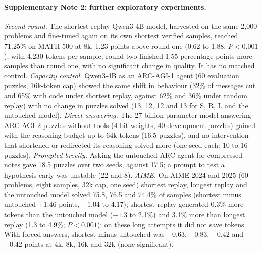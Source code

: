 \documentclass[10pt]{article}
\begin{document}
\paragraph{Supplementary Note 2: further exploratory experiments.} \emph{Second round.} The shortest-replay Qwen3-4B model, harvested on the same 2{,}000 problems and fine-tuned again on its own shortest verified samples, reached 71.25\% on MATH-500 at 8k, 1.23 points above round one (0.62 to 1.88; $P<0.001$), with 4{,}230 tokens per sample; round two finished 1.55 percentage points more samples than round one, with no significant change in quality. It has no matched control. \emph{Capacity control.} Qwen3-4B as an ARC-AGI-1 agent (60 evaluation puzzles, 16k-token cap) showed the same shift in behaviour (32\% of messages cut and 65\% with code under shortest replay, against 62\% and 36\% under random replay) with no change in puzzles solved (13, 12, 12 and 13 for S, R, L and the untouched model). \emph{Direct answering.} The 27-billion-parameter model answering ARC-AGI-2 puzzles without tools (4-bit weights, 40 development puzzles) gained with the reasoning budget up to 64k tokens (16.5 puzzles), and no intervention that shortened or redirected its reasoning solved more (one seed each: 10 to 16 puzzles). \emph{Prompted brevity.} Asking the untouched ARC agent for compressed notes gave 18.5 puzzles over two seeds, against 17.5; a prompt to test a hypothesis early was unstable (22 and 8). \emph{AIME.} On AIME 2024 and 2025 (60 problems, eight samples, 32k cap, one seed) shortest replay, longest replay and the untouched model solved 75.8, 76.5 and 74.4\% of samples (shortest minus untouched $+1.46$ points, $-1.04$ to 4.17); shortest replay generated 0.3\% more tokens than the untouched model ($-1.3$ to 2.1\%) and 3.1\% more than longest replay (1.3 to 4.9\%; $P<0.001$): on these long attempts it did not save tokens. With forced answers, shortest minus untouched was $-0.63$, $-0.83$, $-0.42$ and $-0.42$ points at 4k, 8k, 16k and 32k (none significant).
\end{document}
